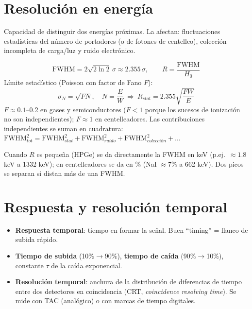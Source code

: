 \section{Resolución en energía}
Capacidad de distinguir dos energías próximas. La afectan: fluctuaciones estadísticas del número de
portadores (o de fotones de centelleo), colección incompleta de carga/luz y ruido electrónico.
\begin{clave}[Resolución]
\[
\mathrm{FWHM}=2\sqrt{2\ln2}\,\sigma\approx2.355\,\sigma,\qquad R=\frac{\mathrm{FWHM}}{H_0}
\]
Límite estadístico (Poisson con factor de Fano $F$):
\[
\sigma_N=\sqrt{FN},\quad N=\frac{E}{W}\ \Rightarrow\ R_{stat}=2.355\sqrt{\frac{FW}{E}}
\]
$F\approx0.1$--0.2 en gases y semiconductores ($F<1$ porque los sucesos de ionización no son independientes);
$F\approx1$ en centelleadores. Las contribuciones independientes se suman en cuadratura:
$\mathrm{FWHM}^2_{tot}=\mathrm{FWHM}^2_{stat}+\mathrm{FWHM}^2_{ruido}+\mathrm{FWHM}^2_{colección}+\dots$
\end{clave}
Cuando $R$ es pequeña (HPGe) se da directamente la FWHM en keV (p.ej.\ $\approx1.8$ keV a 1332 keV);
en centelleadores se da en \% (NaI $\approx7\%$ a 662 keV). Dos picos se separan si distan más de una FWHM.

\section{Respuesta y resolución temporal}
\begin{itemize}
\item \textbf{Respuesta temporal}: tiempo en formar la señal. Buen ``timing'' = flanco de subida rápido.
\item \textbf{Tiempo de subida} (10\%$\to$90\%), \textbf{tiempo de caída} (90\%$\to$10\%), constante $\tau$ de la caída exponencial.
\item \textbf{Resolución temporal}: anchura de la distribución de diferencias de tiempo entre dos detectores en coincidencia
(CRT, \emph{coincidence resolving time}). Se mide con TAC (analógico) o con marcas de tiempo digitales.
\end{itemize}

